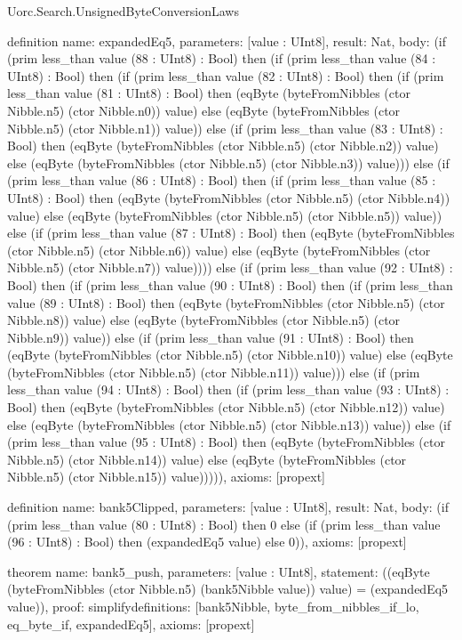 \begin{lexlean}{Uorc.Search.UnsignedByteConversionLaws}
\begin{semanticmodule}
definition{
  name: expandedEq5,
  parameters: [value : UInt8],
  result: Nat,
  body: (if (prim less_than value (88 : UInt8) : Bool) then (if (prim less_than value (84 : UInt8) : Bool) then (if (prim less_than value (82 : UInt8) : Bool) then (if (prim less_than value (81 : UInt8) : Bool) then (eqByte (byteFromNibbles (ctor Nibble.n5) (ctor Nibble.n0)) value) else (eqByte (byteFromNibbles (ctor Nibble.n5) (ctor Nibble.n1)) value)) else (if (prim less_than value (83 : UInt8) : Bool) then (eqByte (byteFromNibbles (ctor Nibble.n5) (ctor Nibble.n2)) value) else (eqByte (byteFromNibbles (ctor Nibble.n5) (ctor Nibble.n3)) value))) else (if (prim less_than value (86 : UInt8) : Bool) then (if (prim less_than value (85 : UInt8) : Bool) then (eqByte (byteFromNibbles (ctor Nibble.n5) (ctor Nibble.n4)) value) else (eqByte (byteFromNibbles (ctor Nibble.n5) (ctor Nibble.n5)) value)) else (if (prim less_than value (87 : UInt8) : Bool) then (eqByte (byteFromNibbles (ctor Nibble.n5) (ctor Nibble.n6)) value) else (eqByte (byteFromNibbles (ctor Nibble.n5) (ctor Nibble.n7)) value)))) else (if (prim less_than value (92 : UInt8) : Bool) then (if (prim less_than value (90 : UInt8) : Bool) then (if (prim less_than value (89 : UInt8) : Bool) then (eqByte (byteFromNibbles (ctor Nibble.n5) (ctor Nibble.n8)) value) else (eqByte (byteFromNibbles (ctor Nibble.n5) (ctor Nibble.n9)) value)) else (if (prim less_than value (91 : UInt8) : Bool) then (eqByte (byteFromNibbles (ctor Nibble.n5) (ctor Nibble.n10)) value) else (eqByte (byteFromNibbles (ctor Nibble.n5) (ctor Nibble.n11)) value))) else (if (prim less_than value (94 : UInt8) : Bool) then (if (prim less_than value (93 : UInt8) : Bool) then (eqByte (byteFromNibbles (ctor Nibble.n5) (ctor Nibble.n12)) value) else (eqByte (byteFromNibbles (ctor Nibble.n5) (ctor Nibble.n13)) value)) else (if (prim less_than value (95 : UInt8) : Bool) then (eqByte (byteFromNibbles (ctor Nibble.n5) (ctor Nibble.n14)) value) else (eqByte (byteFromNibbles (ctor Nibble.n5) (ctor Nibble.n15)) value))))),
  axioms: [propext]
}

definition{
  name: bank5Clipped,
  parameters: [value : UInt8],
  result: Nat,
  body: (if (prim less_than value (80 : UInt8) : Bool) then 0 else (if (prim less_than value (96 : UInt8) : Bool) then (expandedEq5 value) else 0)),
  axioms: [propext]
}

theorem{
  name: bank5_push,
  parameters: [value : UInt8],
  statement: ((eqByte (byteFromNibbles (ctor Nibble.n5) (bank5Nibble value)) value) = (expandedEq5 value)),
  proof: simplify{definitions: [bank5Nibble, byte_from_nibbles_if_lo, eq_byte_if, expandedEq5]},
  axioms: [propext]
}


\end{semanticmodule}
\end{lexlean}
